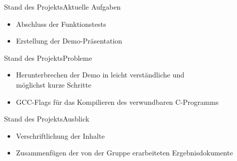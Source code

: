 \begin{frame}{Stand des Projekts}{Aktuelle Aufgaben}
    \begin{itemize}
        \item Abschluss der Funktionstests
        \item Erstellung der Demo-Präsentation
    \end{itemize}
\end{frame}

\begin{frame}{Stand des Projekts}{Probleme}
    \begin{itemize}
        \item Herunterbrechen der Demo in leicht verständliche und \\ möglichst
        kurze Schritte
        \item GCC-Flags für das Kompilieren des verwundbaren C-Programms
    \end{itemize}
\end{frame}

\begin{frame}{Stand des Projekts}{Ausblick}
    \begin{itemize}
        \item Verschriftlichung der Inhalte
        \item Zusammenfügen der von der Gruppe erarbeiteten Ergebnisdokumente
    \end{itemize}
\end{frame}
